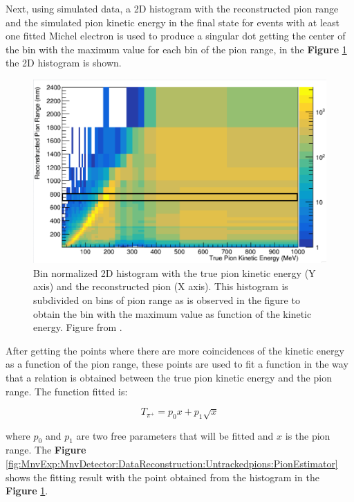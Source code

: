 Next, using simulated data, a 2D histogram with the reconstructed pion range and the simulated pion kinetic energy in the final state for events with at least one fitted Michel electron is used to produce a singular dot getting the center of the bin with the maximum value for each bin of the pion range, in the \textbf{Figure} \ref{fig:MnvExp:MnvDetector:DataReconstruction:Untrackedpions:TpivsPionRange} the 2D histogram is shown.

\begin{figure}[!htb]
    \centering
    \includegraphics[scale=0.33]{Figures/Chapter2/TpivsPionRange.png}
    \caption{Bin normalized 2D histogram with the true pion kinetic energy (Y axis) and the reconstructed pion (X axis). This histogram is subdivided on bins of pion range as is observed in the figure to obtain the bin with the maximum value as function of the kinetic energy. Figure from \cite{TpiEstimator}.}
    \label{fig:MnvExp:MnvDetector:DataReconstruction:Untrackedpions:TpivsPionRange}
\end{figure}

After getting the points where there are more coincidences of the kinetic energy as a function of the pion range, these points are used to fit a function in the way that a relation is obtained between the true pion kinetic energy and the pion range. The function fitted is:

\begin{equation}
    T_{\pi^+} = p_0 x+p_1 \sqrt{x}
\end{equation}

where $p_0$ and $p_1$ are two free parameters that will be fitted and $x$ is the pion range. The \textbf{Figure} \ref{fig:MnvExp:MnvDetector:DataReconstruction:Untrackedpions:PionEstimator} shows the fitting result with the point obtained from the histogram in the \textbf{Figure} \ref{fig:MnvExp:MnvDetector:DataReconstruction:Untrackedpions:TpivsPionRange}.


